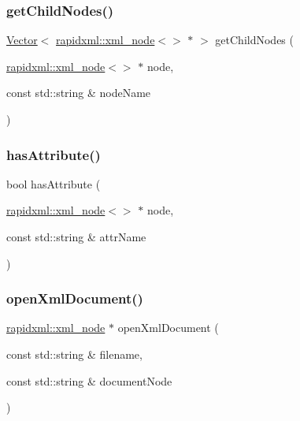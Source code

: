 \mbox{\label{namespacexmlutils_a936753032a5a055762ced99c44aec6f8}} 
\subsubsection{\texorpdfstring{get\+Child\+Nodes()}{getChildNodes()}}
{\footnotesize\ttfamily \mbox{\hyperlink{classVector}{Vector}}$<$ \mbox{\hyperlink{classrapidxml_1_1xml__node}{rapidxml\+::xml\+\_\+node}}$<$$>$ $\ast$ $>$ get\+Child\+Nodes (\begin{DoxyParamCaption}\item[{\mbox{\hyperlink{classrapidxml_1_1xml__node}{rapidxml\+::xml\+\_\+node}}$<$$>$ $\ast$}]{node,  }\item[{const std\+::string \&}]{node\+Name }\end{DoxyParamCaption})}

\mbox{\label{namespacexmlutils_ae8f64d4332fabd1d2a4b2f623522003b}} 
\subsubsection{\texorpdfstring{has\+Attribute()}{hasAttribute()}}
{\footnotesize\ttfamily bool has\+Attribute (\begin{DoxyParamCaption}\item[{\mbox{\hyperlink{classrapidxml_1_1xml__node}{rapidxml\+::xml\+\_\+node}}$<$$>$ $\ast$}]{node,  }\item[{const std\+::string \&}]{attr\+Name }\end{DoxyParamCaption})}

\mbox{\label{namespacexmlutils_a8b4e27a7832af00345b3c4909a09f5b7}} 
\subsubsection{\texorpdfstring{open\+Xml\+Document()}{openXmlDocument()}}
{\footnotesize\ttfamily \mbox{\hyperlink{classrapidxml_1_1xml__node}{rapidxml\+::xml\+\_\+node}} $\ast$ open\+Xml\+Document (\begin{DoxyParamCaption}\item[{const std\+::string \&}]{filename,  }\item[{const std\+::string \&}]{document\+Node }\end{DoxyParamCaption})}

